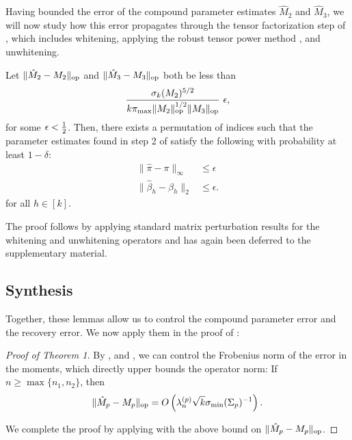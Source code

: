 Having bounded the error of the compound parameter estimates $\hat M_2$ and $\hat M_3$,
we will now study how this error propagates through the tensor factorization step of 
,
which includes whitening, applying the robust tensor power method \cite{AnandkumarGeHsu2012},
and unwhitening.
\begin{lemma}
  \label{lem:tensorPower} Let $\|\hat M_2 - M_2\|_{\text{\rm op}}$ and $\|\hat M_3 - M_3\|_{\text{\rm op}}$ both be less than
  \vspace{-0.5em}
  $$\frac{\sigma_k(M_2)^{5/2}}{k \pi_{\max} \|M_2\|_{\text{\rm op}}^{1/2} \| {M_3} \|_{\text{\rm op}}}~ \epsilon,$$
  for some $\epsilon < \frac{1}{2}$. 
  Then, there exists a permutation of indices such that  the parameter
  estimates found in step 2 of 
  satisfy the following with probability at least $1 - \delta$:
  \begin{align*}
  \|\hat \pi - \pi \|_{\infty} &\le \epsilon \\
  \|\hat \beta_h - \beta_h\|_2 &\le \epsilon.
  \end{align*}
  for all $h \in [k]$.
\end{lemma}

The proof follows by applying standard matrix perturbation results for
the whitening and unwhitening operators and has again been deferred
to the supplementary material.

\subsection{Synthesis}
Together, these lemmas allow us to control the compound parameter error
and the recovery error. We now apply them in the proof of
:

\begin{proof}[Proof of Theorem 1]
By ,  and , we
can control the Frobenius norm of the error in the moments, which
directly upper bounds the operator norm: If $n \ge \max\{n_1, n_2\}$,
then
\begin{align}
  \|\hat M_p - M_p\|_{\text{\rm op}} = O\left( \lambda_n^{(p)} \sqrt{k} \sigma_\text{\rm min}(\Sigma_p)^{-1} \right).
\end{align}

We complete the proof by applying  with the above
bound on $\|\hat M_p - M_p\|_{\text{\rm op}}$.

\end{proof}

